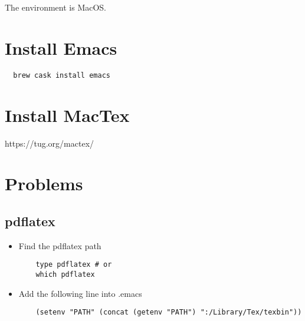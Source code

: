 \documentclass{article}
\begin{document}
The environment is MacOS.

\section{Install Emacs}
\begin{lstlisting}
  brew cask install emacs
\end{lstlisting}
\section{Install MacTex}
https://tug.org/mactex/
\section{Problems}
\subsection{pdflatex}
\begin{itemize}
\item Find the pdflatex path
  \begin{lstlisting}
    type pdflatex # or
    which pdflatex
  \end{lstlisting}
\item Add the following line into .emacs
  \begin{lstlisting}
    (setenv "PATH" (concat (getenv "PATH") ":/Library/Tex/texbin"))
  \end{lstlisting}
\end{itemize}
\end{document}
